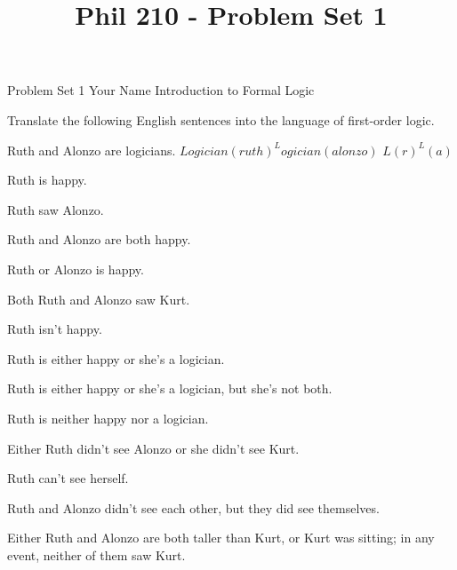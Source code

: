 
\title{Phil 210 - Problem Set 1}

\heading
Problem Set 1
Your Name
Introduction to Formal Logic
\endheading

Translate the following English sentences into the language of first-order logic.

\problems
{}
Ruth and Alonzo are logicians.
        \answer
        $ Logician(ruth) ^ Logician(alonzo) $ \OR $L(r)^L(a)$
        \endanswer

Ruth is happy.
        \answer
        $ $
        \endanswer

Ruth saw Alonzo.
        \answer
        $ $
        \endanswer

Ruth and Alonzo are both happy.
        \answer
        $ $
        \endanswer

Ruth or Alonzo is happy.
        \answer
        $ $
        \endanswer

Both Ruth and Alonzo saw Kurt.
        \answer
        $ $
        \endanswer

Ruth isn't happy.
        \answer
        $ $
        \endanswer

Ruth is either happy or she's a logician.
        \answer
        $ $
        \endanswer

Ruth is either happy or she's a logician, but she's not both.
        \answer
        $ $
        \endanswer

Ruth is neither happy nor a logician.
        \answer
        $ $
        \endanswer

Either Ruth didn't see Alonzo or she didn't see Kurt.
        \answer
        $ $
        \endanswer

Ruth can't see herself.
        \answer
        $ $
        \endanswer

Ruth and Alonzo didn't see each other, but they did see themselves.
        \answer
        $ $
        \endanswer

Either Ruth and Alonzo are both taller than Kurt, or Kurt was sitting; in any event, neither of them saw Kurt.
        \answer
        $ $
        \endanswer

\endproblems
\bye
